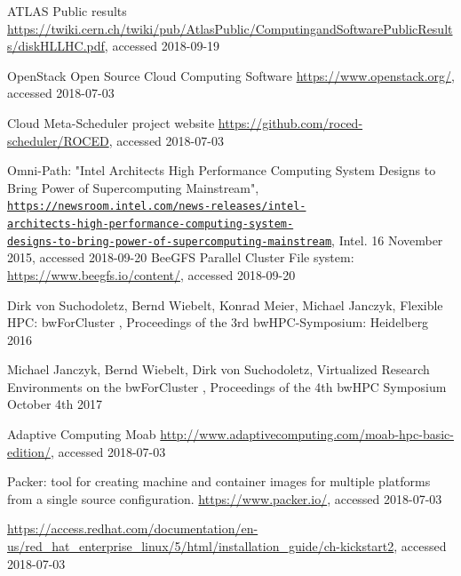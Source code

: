 \begin{thebibliography}{}
%
%
  ATLAS Public results
  \url{https://twiki.cern.ch/twiki/pub/AtlasPublic/ComputingandSoftwarePublicResults/diskHLLHC.pdf},
  accessed 2018-09-19

OpenStack Open Source Cloud Computing Software
\url{https://www.openstack.org/}, accessed 2018-07-03

\Roced Cloud Meta-Scheduler project website
\url{https://github.com/roced-scheduler/ROCED}, accessed 2018-07-03

  Omni-Path:
"Intel Architects High Performance Computing System Designs to Bring
Power of Supercomputing Mainstream",
\texttt{\href{https://newsroom.intel.com/news-releases/intel-architects-high-performance-computing-system-designs-to-bring-power-of-supercomputing-mainstream/}{https://newsroom.intel.com/news-releases/intel-\\architects-high-performance-computing-system-\\designs-to-bring-power-of-supercomputing-mainstream}},
Intel. 16 November 2015, accessed 2018-09-20
BeeGFS Parallel Cluster File system:
\url{https://www.beegfs.io/content/}, accessed 2018-09-20

Dirk von Suchodoletz, Bernd Wiebelt, Konrad Meier, Michael Janczyk,
  Flexible HPC: bwForCluster \NEMO,
  Proceedings of the 3rd bwHPC-Symposium: Heidelberg 2016

Michael Janczyk, Bernd Wiebelt, Dirk von Suchodoletz,
  Virtualized Research Environments on the bwForCluster \NEMO,
  Proceedings of the 4th bwHPC Symposium October 4th 2017



Adaptive Computing Moab
\url{http://www.adaptivecomputing.com/moab-hpc-basic-edition/}, accessed 2018-07-03

Packer: tool for creating machine and container images for multiple platforms from a single source configuration. 
\url{https://www.packer.io/}, accessed 2018-07-03

\url{https://access.redhat.com/documentation/en-us/red_hat_enterprise_linux/5/html/installation_guide/ch-kickstart2}, accessed 2018-07-03


\end{thebibliography}
